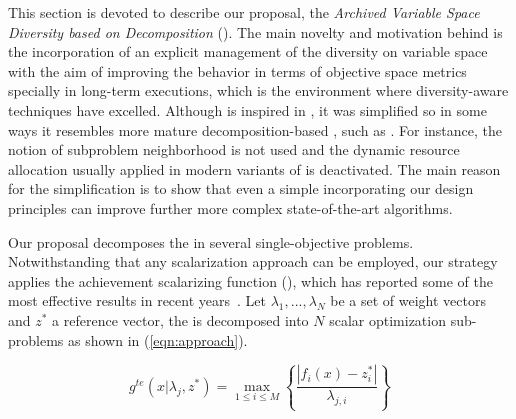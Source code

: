 
This section is devoted to describe our proposal, the \textit{Archived Variable Space Diversity \MOEA{} based on Decomposition} (\AVSDMOEAD{}).
%
The main novelty and motivation behind \AVSDMOEAD{} is the incorporation of an explicit management of the diversity on variable space
with the aim of improving the behavior in terms of objective space metrics specially in long-term executions, which is the
environment where diversity-aware techniques have excelled.
%
Although \AVSDMOEAD{} is inspired in \MOEAD{}, it was simplified so in some ways it resembles more mature
decomposition-based \MOEAS{}, such as \MOGA{}.
%
For instance, the notion of subproblem neighborhood is not used and the dynamic resource allocation usually applied in modern variants
of \MOEAD{} is deactivated.
%
The main reason for the simplification is to show that even a simple \MOEA{} incorporating our design principles can
improve further more complex state-of-the-art algorithms.
%

Our proposal decomposes the \MOP{} in several single-objective problems.
%
Notwithstanding that any scalarization approach can be employed, our strategy applies the achievement scalarizing function (\ASF{}), 
which has reported some of the most effective results in recent years~\cite{deb2013evolutionary, hernandez2015improved}.
%
Let $\lambda_1, ..., \lambda_N$ be a set of weight vectors and $z^*$ a reference vector,
the \MOP{} is decomposed into $N$ scalar optimization sub-problems as shown in (\ref{eqn:approach}).
%

\begin{equation}\label{eqn:approach}
\displaystyle{
 g^{te}(x| \lambda_j, z^*) = \max_{ 1 \leq i \leq M} \left \{ \frac{ | f_i(x) - z_i^*|}{\lambda_{j,i}} \right \} 
}
\end{equation}

